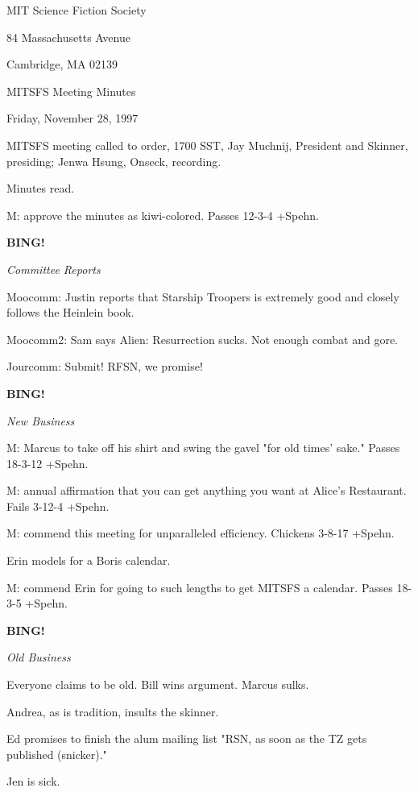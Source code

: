 \documentclass[12pt]{article}
\newcommand{\bing}{{\bf BING!} }
\newcommand{\goto}[1]{\bing \vskip 12pt \centerline{{\em{#1}}}}
\begin{document}
\begin{center}

MIT Science Fiction Society 

84 Massachusetts Avenue

Cambridge, MA 02139

\vspace{12pt}

MITSFS Meeting Minutes 

Friday, November 28, 1997

\end{center}
 
\vspace{18pt}

\setlength{\parskip}{6pt}

\noindent
MITSFS meeting called to order, 1700 SST,
Jay Muchnij, President and Skinner, presiding; Jenwa Hsung, Onseck, recording.

Minutes read.

M: approve the minutes as kiwi-colored. Passes 12-3-4 +Spehn.

\goto{Committee Reports}

Moocomm: Justin reports that Starship Troopers is extremely good and closely follows the Heinlein book.

Moocomm2: Sam says Alien: Resurrection sucks. Not enough combat and gore.

Jourcomm: Submit! RFSN, we promise!

\goto{New Business}

M: Marcus to take off his shirt and swing the gavel "for old times' sake." Passes 18-3-12 +Spehn.

M: annual affirmation that you can get anything you want at Alice's Restaurant. Fails 3-12-4 +Spehn.

M: commend this meeting for unparalleled efficiency. Chickens 3-8-17 +Spehn.

Erin models for a Boris calendar.

M: commend Erin for going to such lengths to get MITSFS a calendar. Passes 18-3-5 +Spehn.

\goto{Old Business}

Everyone claims to be old. Bill wins argument. Marcus sulks.

Andrea, as is tradition, insults the skinner.

Ed promises to finish the alum mailing list "RSN, as soon as the TZ gets published (snicker)."

Jen is sick.
\end{document}
